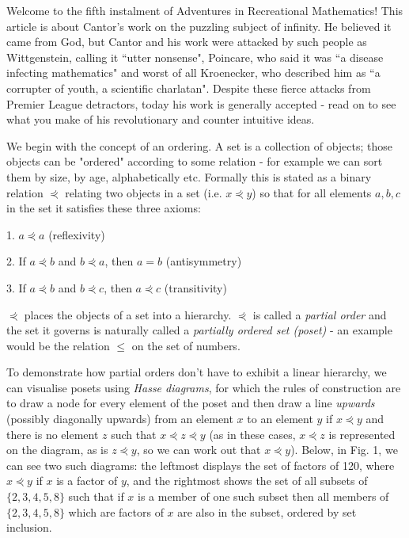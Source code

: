 Welcome to the fifth instalment of Adventures in Recreational Mathematics! This article is about Cantor's work on the puzzling subject of infinity. He believed it came from God, but Cantor and his work were attacked by such people as Wittgenstein, calling it ``utter nonsense",  Poincare, who said it was ``a disease infecting mathematics" and worst of all Kroenecker, who described him as ``a corrupter of youth, a scientific charlatan". Despite these fierce attacks from Premier League detractors, today his work is generally accepted - read on to see what you make of his revolutionary and counter intuitive ideas.

We begin with the concept of an ordering. A set is a collection of objects; those objects can be "ordered" according to some relation - for example we can sort them by size, by age, alphabetically etc. Formally this is stated as a binary relation \(\curlyeqprec\) relating two objects in a set (i.e. \(x\curlyeqprec y\)) so that for all elements \(a, b, c\) in the set it satisfies these three axioms:

1. \( a \curlyeqprec a \) (reflexivity)

2. If \( a \curlyeqprec b \) and \(b \curlyeqprec a \), then \(a = b\) (antisymmetry)

3. If \( a \curlyeqprec b \) and \(b \curlyeqprec c \), then \(a \curlyeqprec c \) (transitivity)

\(\curlyeqprec\) places the objects of a set into a hierarchy. \(\curlyeqprec\) is called a \textit{partial order} and the set it governs is naturally called a \textit{partially ordered set (poset)} - an example would be the relation \(\leq\) on the set of numbers.

To demonstrate how partial orders don't have to exhibit a linear hierarchy, we can visualise posets using \textit{Hasse diagrams}, for which the rules of construction are to draw a node for every element of the poset and then draw a line \textit{upwards} (possibly diagonally upwards) from an element \(x\) to an element \(y\) if \(x \curlyeqprec y \) and there is no element \(z\) such that \(x \curlyeqprec z \curlyeqprec y\) (as in these cases, \(x \curlyeqprec z\) is represented on the diagram, as is \(z \curlyeqprec y\), so we can work out that \(x \curlyeqprec y\)). Below, in Fig. 1, we can see two such diagrams: the leftmost displays the set of factors of 120, where \(x\curlyeqprec y\) if \(x\) is a factor of \(y\), and the rightmost shows the set of all subsets of \(\{2, 3, 4, 5, 8\}\) such that if \(x\) is a member of one such subset then all members of \(\{2,3,4,5,8\}\) which are factors of \(x\) are also in the subset, ordered by set inclusion.

